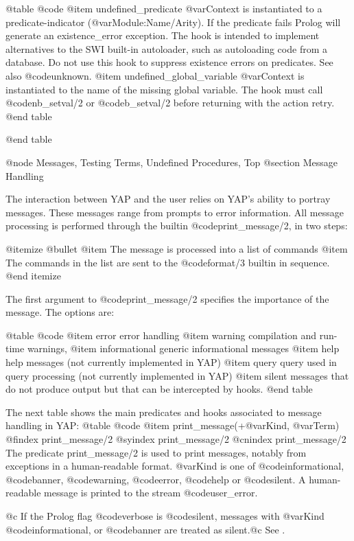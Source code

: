{{{{@table @code
@item undefined_predicate
@var{Context} is instantiated to a predicate-indicator (@var{Module:Name/Arity}). If the predicate fails Prolog will generate an existence_error exception. The hook is intended to implement alternatives to the SWI built-in autoloader, such as autoloading code from a database. Do not use this hook to suppress existence errors on predicates. See also @code{unknown}.
@item undefined_global_variable
@var{Context} is instantiated to the name of the missing global variable. The hook must call @code{nb_setval/2} or @code{b_setval/2} before returning with the action retry.
@end table

@end table

@node Messages, Testing Terms, Undefined Procedures, Top
@section Message Handling

The interaction between YAP and the user relies on YAP's ability to
portray messages. These messages range from prompts to error
information. All message processing is performed through the builtin
@code{print_message/2}, in two steps:

@itemize @bullet
@item The message is processed into a list of commands 
@item The commands in the list are sent to the @code{format/3} builtin
in sequence.
@end itemize 

The first argument to @code{print_message/2} specifies the importance of
the message. The options are:

@table @code
@item error
error handling
@item warning
compilation and run-time warnings,
@item informational
generic informational messages
@item help 
help messages (not currently implemented in YAP)
@item query
query 	used in query processing (not currently implemented in YAP)
@item  silent
messages that do not produce output but that can be intercepted by hooks.
@end table

The next table shows the main predicates and hooks associated to message
handling in YAP:
@table @code
@item print_message(+@var{Kind}, @var{Term})
@findex print_message/2
@syindex print_message/2
@cnindex print_message/2
The predicate print_message/2 is used to print messages, notably from
exceptions in a human-readable format. @var{Kind} is one of
@code{informational}, @code{banner}, @code{warning}, @code{error},
@code{help} or @code{silent}. A human-readable message is printed to
the stream @code{user_error}.

@c %
If the Prolog flag @code{verbose} is @code{silent}, messages with
@var{Kind} @code{informational}, or @code{banner} are treated as
silent.@c  See .

}}}}
